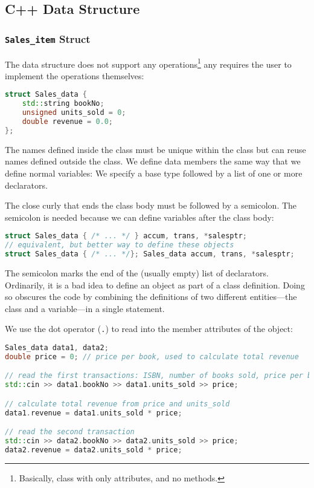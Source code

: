 \subsection{C++ Data Structure}
\label{task:20231122_cpp}

\subsubsection{\texttt{Sales\_item} Struct}

The data structure does not support any operations\footnote{Basically, class with only attributes, and no methods.} any requires the user to implement the operations themselves:
\begin{lstlisting}[language=C++]
struct Sales_data { 
    std::string bookNo; 
    unsigned units_sold = 0; 
    double revenue = 0.0; 
};
\end{lstlisting}
The names defined inside the class must be unique within the class but can reuse names defined outside the class. We define data members the same way that we define normal variables: We specify a base type followed by a list of one or more declarators.

The close curly that ends the class body must be followed by a semicolon. The semicolon is needed because we can define variables after the class body:
\begin{lstlisting}[language=C++]
struct Sales_data { /* ... */ } accum, trans, *salesptr; 
// equivalent, but better way to define these objects 
struct Sales_data { /* ... */}; Sales_data accum, trans, *salesptr;
\end{lstlisting}
The semicolon marks the end of the (usually empty) list of declarators. Ordinarily, it is a bad idea to define an object as part of a class definition. Doing so obscures the code by combining the definitions of two different entities—the class and a variable—in a single statement.

We use the dot operator (\texttt{.}) to read into the member attributes of the object:
\begin{lstlisting}[language=C++]
Sales_data data1, data2;
double price = 0; // price per book, used to calculate total revenue 

// read the first transactions: ISBN, number of books sold, price per book 
std::cin >> data1.bookNo >> data1.units_sold >> price; 

// calculate total revenue from price and units_sold 
data1.revenue = data1.units_sold * price;

// read the second transaction 
std::cin >> data2.bookNo >> data2.units_sold >> price; 
data2.revenue = data2.units_sold * price;
\end{lstlisting}

